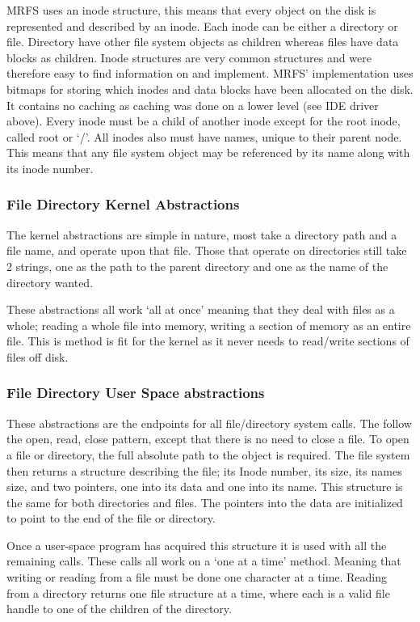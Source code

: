 \documentclass[a4paper]{report}
\begin{document}
MRFS uses an inode structure, this means that every object on the disk is represented and described by an inode. Each inode can be either a directory or file. Directory have other file system objects as children whereas files have data blocks as children. Inode structures are very common structures and were therefore easy to find information on and implement. MRFS' implementation uses bitmaps for storing which inodes and data blocks have been allocated on the disk. It contains no caching as caching was done on a lower level (see IDE driver above). Every inode must be a child of another inode except for the root inode, called root or `/'. All inodes also must have names, unique to their parent node. This means that any file system object may be referenced by its name along with its inode number.

\subsubsection{File Directory Kernel Abstractions}

The kernel abstractions are simple in nature, most take a directory path and a file name, and operate upon that file. Those that operate on directories still take 2 strings, one as the path to the parent directory and one as the name of the directory wanted.

These abstractions all work `all at once' meaning that they deal with files as a whole; reading a whole file into memory, writing a section of memory as an entire file. This is method is fit for the kernel as it never needs to read/write sections of files off disk.

\subsubsection{File Directory User Space abstractions}

These abstractions are the endpoints for all file/directory system calls. The follow the open, read, close pattern, except that there is no need to close a file. To open a file or directory, the full absolute path to the object is required. The file system then returns a structure describing the file; its Inode number, its size, its names size, and two pointers, one into its data and one into its name. This structure is the same for both directories and files. The pointers into the data are initialized to point to the end of the file or directory.

Once a user-space program has acquired this structure it is used with all the remaining calls. These calls all work on a `one at a time' method. Meaning that writing or reading from a file must be done one character at a time. Reading from a directory returns one file structure at a time, where each is a valid file handle to one of the children of the directory.
\end{document}
